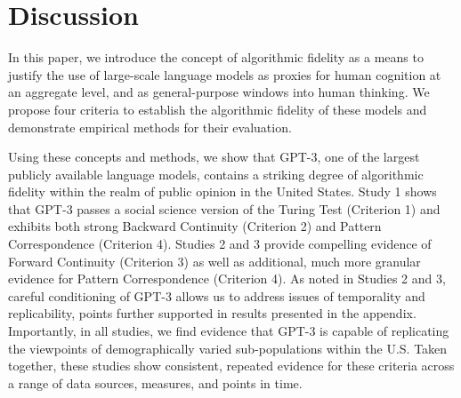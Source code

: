 \documentclass[11pt]{article}
\begin{document}
%
%



\section{Discussion}

In this paper, we introduce the concept of algorithmic fidelity as a means to justify the use of large-scale language models as proxies for human cognition at an aggregate level, and as general-purpose windows into human thinking. We propose four criteria to establish the algorithmic fidelity of these models and demonstrate empirical methods for their evaluation.

Using these concepts and methods, we show that GPT-3, one of the largest publicly available language models, contains a striking degree of algorithmic fidelity within the realm of public opinion in the United States. Study 1 shows that GPT-3 passes a social science version of the Turing Test (Criterion 1) and exhibits both strong Backward Continuity (Criterion 2) and Pattern Correspondence (Criterion 4). Studies 2 and 3 provide compelling evidence of Forward Continuity (Criterion 3) as well as additional, much more granular evidence for Pattern Correspondence (Criterion 4). As noted in Studies 2 and 3, careful conditioning of GPT-3 allows us to address issues of temporality and replicability, points further supported in results presented in the appendix. Importantly, in all studies, we find evidence that GPT-3 is capable of replicating the viewpoints of demographically varied sub-populations within the U.S. Taken together, these studies show consistent, repeated evidence for these criteria across a range of data sources, measures, and points in time.
\end{document}
